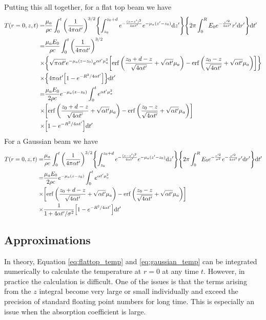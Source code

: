 \documentclass[]{article}
\begin{document}
Putting this all together, for a flat top beam we have
\begin{align}
  \label{eq:flattop_temp}
  T(r=0, z,t) =& \frac{\mu_a}{\rho c} \int_0^t \qty(\frac{1}{4\pi \alpha t'})^{3/2} \qty{\int_{z_0}^{z_0 + d}e^{-\frac{(z-z')^2}{4\alpha t'}} e^{-\mu_a (z'-z_0)} \dd z'} \qty{2\pi\int_{0}^{R} E_0 e^{-\frac{r'^2}{4\alpha t'}}r'\dd r'}\dd t' \nonumber \\
  =& \frac{\mu_a E_0}{\rho c} \int_0^t \qty(\frac{1}{4\pi \alpha t'})^{3/2}  \nonumber \\
  \times & \qty{\sqrt{\pi\alpha t'} e^{-\mu_a (z-z_0)} e^{\alpha t'\mu_a^2}\qty[\erf\qty(\frac{z_0 + d - z}{\sqrt{4\alpha t'}} + \sqrt{\alpha t'}\mu_a ) - \erf\qty(\frac{z_0 - z}{\sqrt{4\alpha t'}} + \sqrt{\alpha t'}\mu_a ) ]} \nonumber \\
  \times & \qty{4\pi \alpha t' \qty[1 - e^{-R^2/4\alpha t'}] } \dd t' \nonumber \\
  =& \frac{\mu_aE_0}{2\rho c}e^{-\mu_a (z-z_0)} \int_0^t e^{\alpha t'\mu_a^2}  \nonumber \\
  \times & \qty[\erf\qty(\frac{z_0 + d - z}{\sqrt{4\alpha t'}} + \sqrt{\alpha t'}\mu_a ) - \erf\qty(\frac{z_0 - z}{\sqrt{4\alpha t'}} + \sqrt{\alpha t'}\mu_a ) ] \nonumber \\
  \times & \qty[1 - e^{-R^2/4\alpha t'} ]
  \dd t'
\end{align}
For a Gaussian beam we have
\begin{align}
  \label{eq:gaussian_temp}
  T(r =0,z,t) =& \frac{\mu_a}{\rho c} \int_0^t \qty(\frac{1}{4\pi \alpha t'})^{3/2} \qty{\int_{z_0}^{z_0 + d}e^{-\frac{(z-z')^2}{4\alpha t'}} e^{-\mu_a (z'-z_0)} \dd z'} \qty{2\pi\int_{0}^{R} E_0 e^{-\frac{r'^2}{\sigma^2}} e^{-\frac{r'^2}{4\alpha t'}}r'\dd r'}\dd t' \nonumber \\
  =& \frac{\mu_aE_0}{2\rho c}e^{-\mu_a (z-z_0)} \int_0^t e^{\alpha t'\mu_a^2}  \nonumber \\
  \times & \qty[\erf\qty(\frac{z_0 + d - z}{\sqrt{4\alpha t'}} + \sqrt{\alpha t'}\mu_a ) - \erf\qty(\frac{z_0 - z}{\sqrt{4\alpha t'}} + \sqrt{\alpha t'}\mu_a ) ] \nonumber \\
  \times & \frac{1}{1 + 4\alpha t'/\sigma^2} \qty[1 - e^{-R^2/4\alpha t'} ]
  \dd t'
\end{align}


\subsection{Approximations}

In theory, Equation \ref{eq:flattop_temp} and \ref{eq:gaussian_temp} can be integrated
numerically to calculate the temperature at $r = 0$ at any time $t$. However,
in practice the calculation is difficult. One of the issues is that the
terms arising from the $z$ integral become very large or small individually and
exceed the precision of standard floating point numbers for long time. This
is especially an issue when the absorption coefficient is large.
\end{document}
